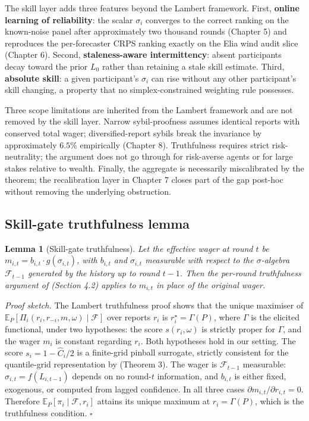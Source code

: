 \documentclass[
  11pt,
  a4paper,
  oneside]{report}
\newtheorem{lemma}{Lemma}
\begin{document}
The skill layer adds three features beyond the Lambert framework. First,
\textbf{online learning of reliability}: the scalar \(\sigma_i\)
converges to the correct ranking on the known-noise panel after
approximately two thousand rounds (Chapter 5) and reproduces the
per-forecaster CRPS ranking exactly on the Elia wind audit slice
(Chapter 6). Second, \textbf{staleness-aware intermittency}: absent
participants decay toward the prior \(L_0\) rather than retaining a
stale skill estimate. Third, \textbf{absolute skill}: a given
participant's \(\sigma_i\) can rise without any other participant's
skill changing, a property that no simplex-constrained weighting rule
possesses.

Three scope limitations are inherited from the Lambert framework and are
not removed by the skill layer. Narrow sybil-proofness assumes identical
reports with conserved total wager; diversified-report sybils break the
invariance by approximately \(6.5\%\) empirically (Chapter 8).
Truthfulness requires strict risk-neutrality; the argument does not go
through for risk-averse agents or for large stakes relative to wealth.
Finally, the aggregate is necessarily miscalibrated by the
\citet{ranjan2010combining} theorem; the recalibration layer in Chapter
7 closes part of the gap post-hoc without removing the underlying
obstruction.

\subsection{Skill-gate truthfulness
lemma}\label{skill-gate-truthfulness-lemma}

\begin{lemma}[Skill-gate truthfulness]
\label{lem:skill-gate-truthful}
Let the effective wager at round $t$ be
$m_{i, t} = b_{i, t} \cdot g(\sigma_{i, t})$, with $b_{i, t}$ and
$\sigma_{i, t}$ measurable with respect to the $\sigma$-algebra
$\mathcal{F}_{t-1}$ generated by the history up to round $t - 1$.
Then the per-round truthfulness argument of
\citet{lambert2008selffinanced} (Section 4.2) applies to $m_{i, t}$ in
place of the original wager.
\end{lemma}

\noindent\textit{Proof sketch.} The Lambert truthfulness proof shows
that the unique maximiser of
\(\mathbb{E}_P[\Pi_i(r_i, r_{-i}, m, \omega) \mid \mathcal{F}]\) over
reports \(r_i\) is \(r_i^\star = \Gamma(P)\), where \(\Gamma\) is the
elicited functional, under two hypotheses: the score \(s(r_i, \omega)\)
is strictly proper for \(\Gamma\), and the wager \(m_i\) is constant
regarding \(r_i\). Both hypotheses hold in our setting. The score
\(s_i = 1 - \hat C_i / 2\) is a finite-grid pinball surrogate, strictly
consistent for the quantile-grid representation by
\citet{gneiting2007strictly} (Theorem 3). The wager is
\(\mathcal{F}_{t-1}\) measurable: \(\sigma_{i, t} = f(L_{i, t-1})\)
depends on no round-\(t\) information, and \(b_{i, t}\) is either fixed,
exogenous, or computed from lagged confidence. In all three cases
\(\partial m_{i, t} / \partial r_{i, t} = 0\). Therefore
\(\mathbb{E}_P[\pi_i \mid \mathcal{F}, r_i]\) attains its unique maximum
at \(r_i = \Gamma(P)\), which is the truthfulness condition. \(\square\)
\end{document}
